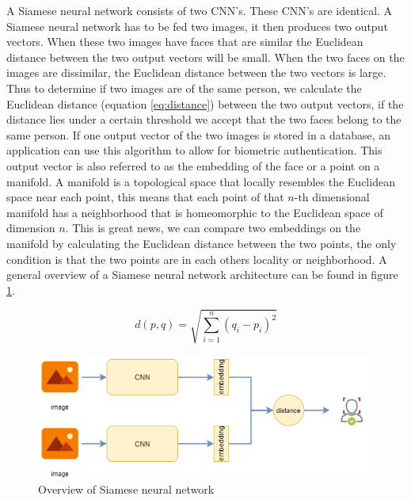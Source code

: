 A Siamese neural network consists of two CNN's. These CNN's are identical. A Siamese neural network has to be fed two images, it then produces two output vectors. When these two images have faces that are similar the Euclidean distance between the two output vectors will be small. When the two faces on the images are dissimilar, the Euclidean distance between the two vectors is large. Thus to determine if two images are of the same person, we calculate the Euclidean distance (equation \ref{eq:distance}) between the two output vectors, if the distance lies under a certain threshold we accept that the two faces belong to the same person. If one output vector of the two images is stored in a database, an application can use this algorithm to allow for biometric authentication. This output vector is also referred to as the embedding of the face or a point on a manifold. A manifold is a topological space that locally resembles the Euclidean space near each point, this means that each point of that $n$-th dimensional manifold has a neighborhood that is homeomorphic to the Euclidean space of dimension $n$. This is great news, we can compare two embeddings on the manifold by calculating the Euclidean distance between the two points, the only condition is that the two points are in each others locality or neighborhood. A general overview of a Siamese neural network architecture can be found in figure \ref{fig:siamese}.

\begin{equation} \label{eq:distance}
  d(p,q) = \sqrt{\sum_{i=1}^{n}(q_{i}-p_{i})^{2}}
\end{equation}

\begin{figure}[H]
  \includegraphics[width=\linewidth]{fig/siamese.png}
  \caption{Overview of Siamese neural network}
  \label{fig:siamese}
\end{figure}

